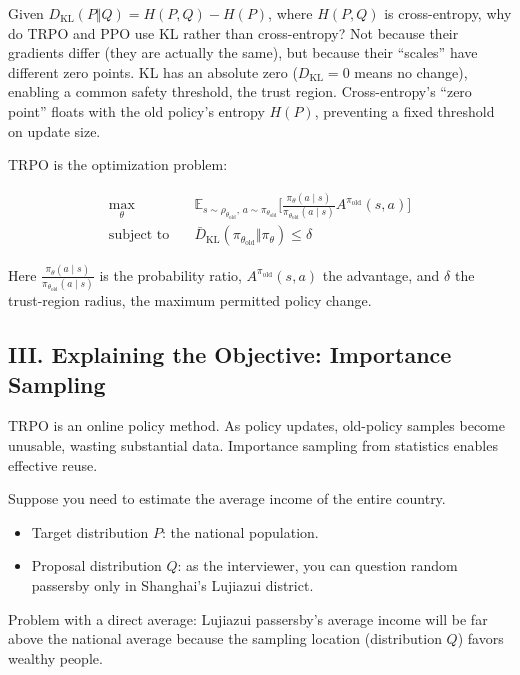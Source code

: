 Given \(D_{\mathrm{KL}}(P\Vert Q)=H(P,Q)-H(P)\), where \(H(P,Q)\) is cross-entropy, why do TRPO and PPO use KL rather than cross-entropy? Not because their gradients differ (they are actually the same), but because their ``scales'' have different zero points. KL has an absolute zero (\(D_{\mathrm{KL}}=0\) means no change), enabling a common safety threshold, the trust region. Cross-entropy's ``zero point'' floats with the old policy's entropy \(H(P)\), preventing a fixed threshold on update size.

TRPO is the optimization problem:

\[
\begin{aligned}
\max_\theta\quad
& \mathbb{E}_{s\sim\rho_{\theta_{\mathrm{old}}},\,a\sim\pi_{\theta_{\mathrm{old}}}}
\bigl[
\frac{\pi_\theta(a\mid s)}{\pi_{\theta_{\mathrm{old}}}(a\mid s)}
A^{\pi_{\mathrm{old}}}(s,a)
\bigr] \\
\text{subject to}\quad
& \bar{D}_{\mathrm{KL}}(\pi_{\theta_{\mathrm{old}}}\Vert \pi_\theta)\le \delta
\end{aligned}
\]

Here \(\frac{\pi_\theta(a\mid s)}{\pi_{\theta_{\mathrm{old}}}(a\mid s)}\) is the probability ratio, \(A^{\pi_{\mathrm{old}}}(s,a)\) the advantage, and \(\delta\) the trust-region radius, the maximum permitted policy change.

\hypertarget{iii.-explaining-the-objective-importance-sampling}{%
\subsection{III. Explaining the Objective: Importance Sampling}\label{iii.-explaining-the-objective-importance-sampling}}

TRPO is an online policy method. As policy updates, old-policy samples become unusable, wasting substantial data. Importance sampling from statistics enables effective reuse.

Suppose you need to estimate the average income of the entire country.

\begin{itemize}
\tightlist
\item
  Target distribution \(P\): the national population.
\item
  Proposal distribution \(Q\): as the interviewer, you can question random passersby only in Shanghai's Lujiazui district.
\end{itemize}

Problem with a direct average: Lujiazui passersby's average income will be far above the national average because the sampling location (distribution \(Q\)) favors wealthy people.

